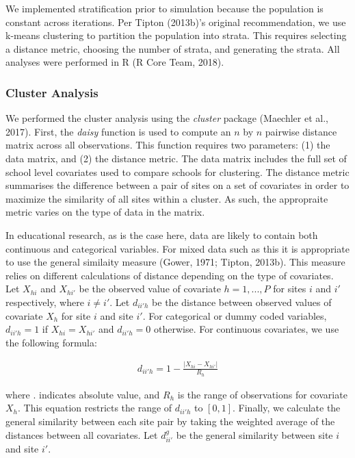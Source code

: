 \documentclass[man,floatsintext]{apa6}
\begin{document}
We implemented stratification prior to simulation because the population is constant across iterations. Per Tipton (2013b)'s original recommendation, we use k-means clustering to partition the population into strata. This requires selecting a distance metric, choosing the number of strata, and generating the strata. All analyses were performed in R (R Core Team, 2018).

\hypertarget{cluster-analysis}{%
\subsubsection{Cluster Analysis}\label{cluster-analysis}}

We performed the cluster analysis using the \emph{cluster} package (Maechler et al., 2017). First, the \emph{daisy} function is used to compute an \(n\) by \(n\) pairwise distance matrix across all observations. This function requires two parameters: (1) the data matrix, and (2) the distance metric. The data matrix includes the full set of school level covariates used to compare schools for clustering. The distance metric summarises the difference between a pair of sites on a set of covariates in order to maximize the similarity of all sites within a cluster. As such, the appropraite metric varies on the type of data in the matrix.

In educational research, as is the case here, data are likely to contain both continuous and categorical variables. For mixed data such as this it is appropriate to use the general similaity measure (Gower, 1971; Tipton, 2013b). This measure relies on different calculations of distance depending on the type of covariates. Let \(X_{hi}\) and \(X_{hi'}\) be the observed value of covariate \(h = {1, ..., P}\) for sites \(i\) and \(i'\) respectively, where \(i \ne i'\). Let \(d_{ii'h}\) be the distance between observed values of covariate \(X_{h}\) for site \(i\) and site \(i'\). For categorical or dummy coded variables, \(d_{ii'h} = 1\) if \(X_{hi} = X_{hi'}\) and \(d_{ii'h} = 0\) otherwise. For continuous covariates, we use the following formula:

\begin{align}
  d_{ii'h} = 1 - \frac{|X_{hi} - X_{hi'}|}{R_h}
\end{align}

where \textbar{}.\textbar{} indicates absolute value, and \(R_h\) is the range of observations for covariate \(X_h\). This equation restricts the range of \(d_{ii'h}\) to \([0,1]\). Finally, we calculate the general similarity between each site pair by taking the weighted average of the distances between all covariates. Let \(d^{g}_{ii'}\) be the general similarity between site \(i\) and site \(i'\).
\end{document}
